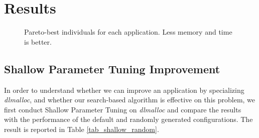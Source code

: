 
\section{Results}

\begin{figure*}[htbp]
	\centering
	\caption{Pareto-best individuals for each application. Less memory and time is better.}\label{fig_10}
\end{figure*}

\subsection{Shallow Parameter Tuning Improvement}

\begin{table}[hbtp]
\centering
\caption{Least memory/time consumption found by Shallow Parameter Tuning and Random Search}
\label{tab_shallow_random}
\end{table}

In order to understand whether we can improve an application by specializing \emph{dlmalloc}, and whether our search-based algorithm is effective on this problem, we first conduct Shallow Parameter Tuning on \emph{dlmalloc} and compare the results with the performance of the default and randomly generated configurations. The result is reported in Table \ref{tab_shallow_random}. 

